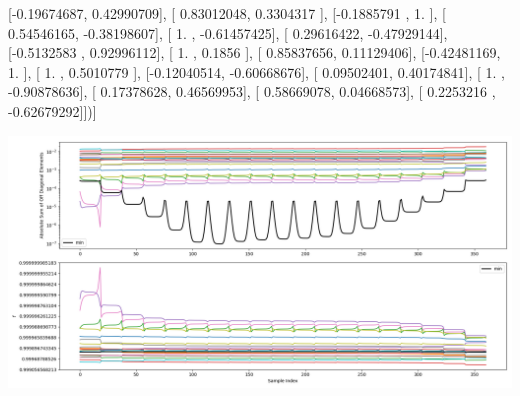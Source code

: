 \documentclass{article}
\begin{document}
       [-0.19674687,  0.42990709],
       [ 0.83012048,  0.3304317 ],
       [-0.1885791 ,  1.        ],
       [ 0.54546165, -0.38198607],
       [ 1.        , -0.61457425],
       [ 0.29616422, -0.47929144],
       [-0.5132583 ,  0.92996112],
       [ 1.        ,  0.1856    ],
       [ 0.85837656,  0.11129406],
       [-0.42481169,  1.        ],
       [ 1.        ,  0.5010779 ],
       [-0.12040514, -0.60668676],
       [ 0.09502401,  0.40174841],
       [ 1.        , -0.90878636],
       [ 0.17378628,  0.46569953],
       [ 0.58669078,  0.04668573],
       [ 0.2253216 , -0.62679292]])]
\begin{center}
\includegraphics[scale=.9]{report_pickled_controls242/control_dpn_all.png}

\end{center}
\end{document}

